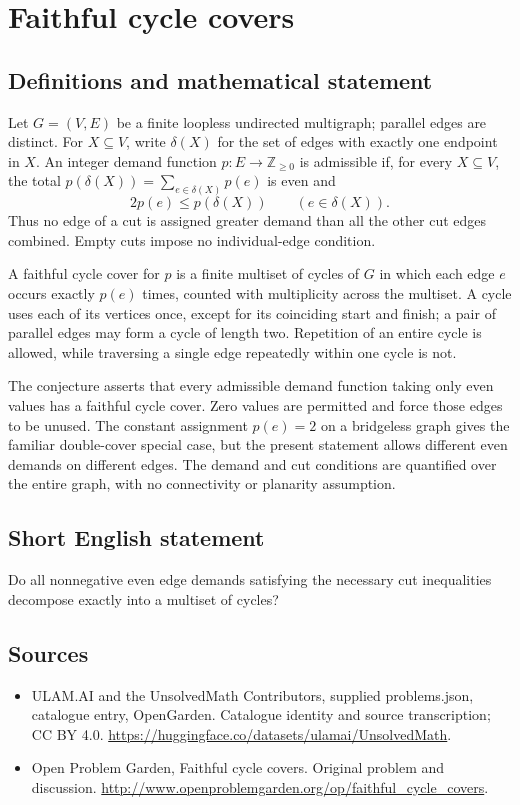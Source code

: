\documentclass[11pt,a4paper]{article}
\begin{document}
\section*{Faithful cycle covers}\label{statement}

\subsection{Definitions and mathematical statement}
Let $G=(V,E)$ be a finite loopless undirected multigraph; parallel edges are distinct. For $X\subseteq V$, write $\delta(X)$ for the set of edges with exactly one endpoint in $X$. An integer demand function $p:E\to\mathbb Z_{\ge0}$ is admissible if, for every $X\subseteq V$, the total $p(\delta(X))=\sum_{e\in\delta(X)}p(e)$ is even and
\[
       2p(e)\le p(\delta(X))\qquad(e\in\delta(X)).
\]
Thus no edge of a cut is assigned greater demand than all the other cut edges combined. Empty cuts impose no individual-edge condition.

A faithful cycle cover for $p$ is a finite multiset of cycles of $G$ in which each edge $e$ occurs exactly $p(e)$ times, counted with multiplicity across the multiset. A cycle uses each of its vertices once, except for its coinciding start and finish; a pair of parallel edges may form a cycle of length two. Repetition of an entire cycle is allowed, while traversing a single edge repeatedly within one cycle is not.

The conjecture asserts that every admissible demand function taking only even values has a faithful cycle cover. Zero values are permitted and force those edges to be unused. The constant assignment $p(e)=2$ on a bridgeless graph gives the familiar double-cover special case, but the present statement allows different even demands on different edges. The demand and cut conditions are quantified over the entire graph, with no connectivity or planarity assumption.
\subsection{Short English statement}
Do all nonnegative even edge demands satisfying the necessary cut inequalities decompose exactly into a multiset of cycles?
\subsection{Sources}
\begin{itemize}
\item[S1] ULAM.AI and the UnsolvedMath Contributors, supplied problems.json, catalogue entry, OpenGarden. Catalogue identity and source transcription; CC BY 4.0.
\url{https://huggingface.co/datasets/ulamai/UnsolvedMath}.
\item[S2] Open Problem Garden, Faithful cycle covers. Original problem and discussion.
\url{http://www.openproblemgarden.org/op/faithful_cycle_covers}.
\end{itemize}
\end{document}
